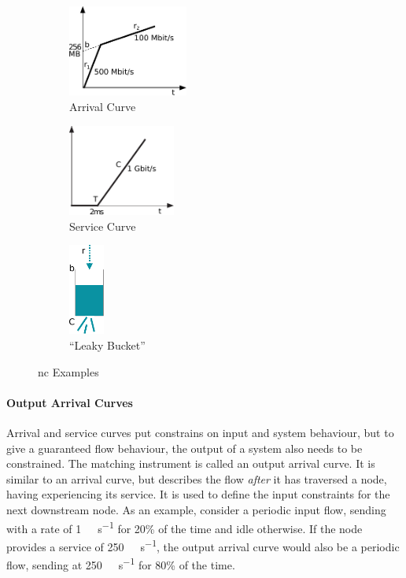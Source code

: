 \begin{figure}[H]
        \centering
        \begin{subfigure}[b]{0.3\textwidth}
            \centering
            \includegraphics*[width=\linewidth,height=3cm,keepaspectratio]{Figures/nc_core_examples_a}
            \caption{Arrival Curve}\label{fig:ex_arr}
        \end{subfigure}
        \begin{subfigure}[b]{0.3\textwidth}
            \centering
            \includegraphics*[width=\linewidth,height=3cm,keepaspectratio]{Figures/nc_core_examples_b}
            \caption{Service Curve}\label{fig:ex_serv}
        \end{subfigure}
        \begin{subfigure}[b]{0.3\textwidth}
            \centering
              \includegraphics*[width=\linewidth,height=3cm,keepaspectratio]{Figures/nc_core_examples_c}
            \caption{\enquote{Leaky Bucket}}\label{fig:ex_leaky}
        \end{subfigure}
        \caption{\gls{nc} Examples}\label{fig:ex}
\end{figure}
%
\paragraph{Output Arrival Curves}
Arrival and service curves put constrains on input and system behaviour, but to give a guaranteed flow behaviour, the output of a system also needs to be constrained.
The matching instrument is called an output arrival curve. It is similar to an arrival curve, but describes the flow \emph{after} it has traversed a node, having experiencing its service.
It is used to define the input constraints for the next downstream node.
As an example, consider a periodic input flow, sending with a rate of \SI{1}{\giga\bit\per\second} for 20\% of the time and idle otherwise.
If the node provides a service of \SI{250}{\mega\bit\per\second}, the output arrival curve would also be a periodic flow, sending at \SI{250}{\mega\bit\per\second} for 80\% of the time.
